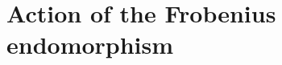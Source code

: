 \documentclass{article}%
\def\smat{\def\arraystretch{.6}\mat}
\begin{document}
% 
% 
\section{Action of the Frobenius endomorphism}%
\end{document}
